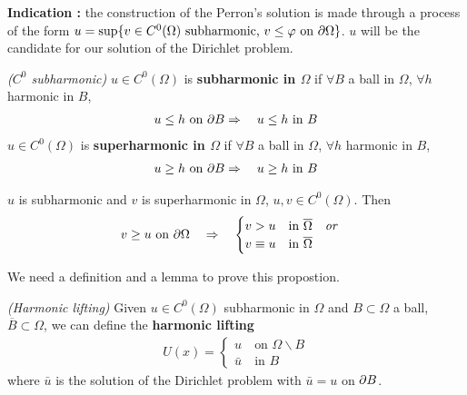 \documentclass[12pt,a4paper]{article}
\begin{document}
\textbf{Indication :} the construction of the Perron's solution is made through a process of the form $u = \sup \{ v\in C^0(\Omega) \text{ subharmonic, } v\leq \varphi \text{ on } \partial \Omega \}$. $u$ will be the candidate for our solution of the Dirichlet problem.
\s

 \emph{($C^0$ subharmonic)} $u\in C^0(\Omega)$ is \textbf{subharmonic in $\Omega$} if $\forall B$ a ball in $\Omega$, $\forall h$ harmonic in $B$,
\begin{align*}
u\leq h \text{ on }\partial B \Rightarrow \quad u\leq h \text{ in } B
\end{align*}
$u \in C^0(\Omega)$ is \textbf{superharmonic in $\Omega$} if $\forall B$ a ball in $\Omega$, $\forall h$ harmonic in $B$,
\begin{align*}
u\geq h \text{ on }\partial B \Rightarrow \quad u\geq h \text{ in } B
\end{align*}
\s

 $u$ is subharmonic and $v$ is superharmonic in $\Omega$, $u, v\in C^0(\Omega)$. Then
\begin{align*}
v\geq u \text{ on } \partial \Omega \quad \Rightarrow \quad \begin{cases}
v > u \quad \text{in } \overline{\Omega} \quad \emph{or} \\
v \equiv u \quad \text{in } \overline{\Omega}
\end{cases}
\end{align*}
\s

We need a definition and a lemma to prove this propostion.
\s

 \emph{(Harmonic lifting)} Given $u\in C^0(\Omega)$ subharmonic in $\Omega$ and $B\subset \Omega$ a ball, $\overline{B} \subset \Omega$, we can define the \textbf{harmonic lifting}
\begin{align*}
U(x) = \begin{cases}
u \quad \text{on } \Omega \backslash B \\
\bar{u} \quad \text{in } B
\end{cases}
\end{align*}
where $\bar{u}$ is the solution of the Dirichlet problem with $\bar{u} = u$ on $\partial B$.
\s
\end{document}
